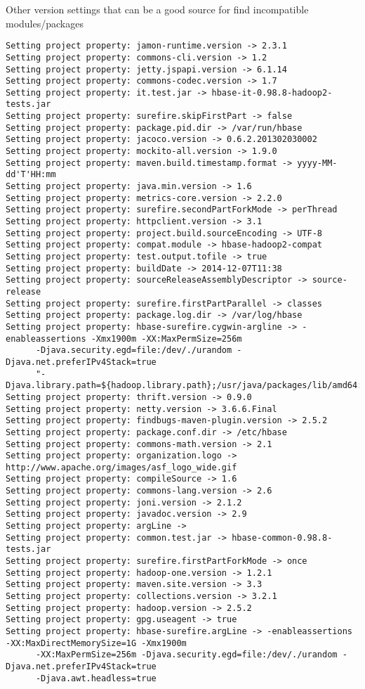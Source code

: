 Other version settings that can be a good source for find incompatible
modules/packages
\begin{verbatim}
Setting project property: jamon-runtime.version -> 2.3.1
Setting project property: commons-cli.version -> 1.2
Setting project property: jetty.jspapi.version -> 6.1.14
Setting project property: commons-codec.version -> 1.7
Setting project property: it.test.jar -> hbase-it-0.98.8-hadoop2-tests.jar
Setting project property: surefire.skipFirstPart -> false
Setting project property: package.pid.dir -> /var/run/hbase
Setting project property: jacoco.version -> 0.6.2.201302030002
Setting project property: mockito-all.version -> 1.9.0
Setting project property: maven.build.timestamp.format -> yyyy-MM-dd'T'HH:mm
Setting project property: java.min.version -> 1.6
Setting project property: metrics-core.version -> 2.2.0
Setting project property: surefire.secondPartForkMode -> perThread
Setting project property: httpclient.version -> 3.1
Setting project property: project.build.sourceEncoding -> UTF-8
Setting project property: compat.module -> hbase-hadoop2-compat
Setting project property: test.output.tofile -> true
Setting project property: buildDate -> 2014-12-07T11:38
Setting project property: sourceReleaseAssemblyDescriptor -> source-release
Setting project property: surefire.firstPartParallel -> classes
Setting project property: package.log.dir -> /var/log/hbase
Setting project property: hbase-surefire.cygwin-argline -> -enableassertions -Xmx1900m -XX:MaxPermSize=256m
      -Djava.security.egd=file:/dev/./urandom -Djava.net.preferIPv4Stack=true
      "-Djava.library.path=${hadoop.library.path};/usr/java/packages/lib/amd64:/usr/lib64:/lib64:/lib:/usr/lib"
Setting project property: thrift.version -> 0.9.0
Setting project property: netty.version -> 3.6.6.Final
Setting project property: findbugs-maven-plugin.version -> 2.5.2
Setting project property: package.conf.dir -> /etc/hbase
Setting project property: commons-math.version -> 2.1
Setting project property: organization.logo -> http://www.apache.org/images/asf_logo_wide.gif
Setting project property: compileSource -> 1.6
Setting project property: commons-lang.version -> 2.6
Setting project property: joni.version -> 2.1.2
Setting project property: javadoc.version -> 2.9
Setting project property: argLine ->
Setting project property: common.test.jar -> hbase-common-0.98.8-tests.jar
Setting project property: surefire.firstPartForkMode -> once
Setting project property: hadoop-one.version -> 1.2.1
Setting project property: maven.site.version -> 3.3
Setting project property: collections.version -> 3.2.1
Setting project property: hadoop.version -> 2.5.2
Setting project property: gpg.useagent -> true
Setting project property: hbase-surefire.argLine -> -enableassertions -XX:MaxDirectMemorySize=1G -Xmx1900m
      -XX:MaxPermSize=256m -Djava.security.egd=file:/dev/./urandom -Djava.net.preferIPv4Stack=true
      -Djava.awt.headless=true
\end{verbatim}


